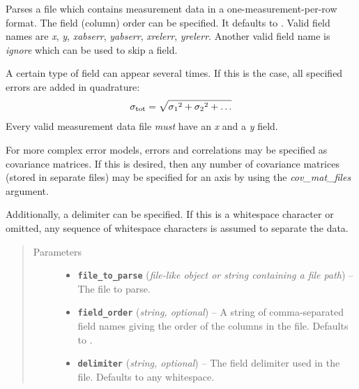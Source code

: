 \documentclass[a4paper,10pt,english]{sphinxmanual}
\begin{document}
\begin{fulllineitems}
\label{module_doc:kafe.file_tools.parse_column_data}
Parses a file which contains measurement data in a one-measurement-per-row
format. The field (column) order can be specified. It defaults to
.
Valid field names are \emph{x}, \emph{y}, \emph{xabserr}, \emph{yabserr}, \emph{xrelerr},
\emph{yrelerr}. Another valid field name is \emph{ignore} which can be used to skip
a field.

A certain type of field can appear several times. If this is the case, all
specified errors are added in quadrature:
\begin{gather}
\begin{split}\sigma_{\text{tot}} = \sqrt{{\sigma_1}^2+{\sigma_2}^2+\dots}\end{split}\notag
\end{gather}
Every valid measurement data file \emph{must} have an \emph{x} and a \emph{y} field.

For more complex error models, errors and correlations may be specified as
covariance matrices. If this is desired, then any number of covariance
matrices (stored in separate files) may be specified for an axis by
using the \emph{cov\_mat\_files} argument.

Additionally, a delimiter can be specified. If this is a whitespace
character or omitted, any sequence of whitespace characters is assumed to
separate the data.
\begin{quote}\begin{description}
\item[{Parameters}] \leavevmode\begin{itemize}
\item {} 
\textbf{\texttt{file\_to\_parse}} (\emph{file-like object or string containing a file path}) -- The file to parse.

\item {} 
\textbf{\texttt{field\_order}} (\emph{string, optional}) -- A string of comma-separated field names giving the order of the columns
in the file. Defaults to .

\item {} 
\textbf{\texttt{delimiter}} (\emph{string, optional}) -- The field delimiter used in the file. Defaults to any whitespace.


\end{itemize}
\end{description}
\end{quote}
\end{fulllineitems}
\end{document}

